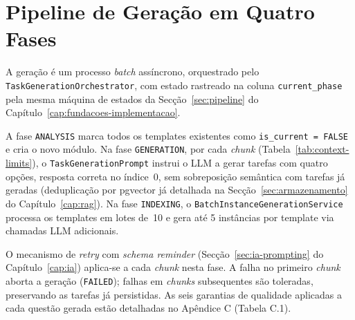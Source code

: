 \section{Pipeline de Geração em Quatro Fases} \label{sec:pipeline-geracao}

A geração é um processo \textit{batch} assíncrono, orquestrado pelo \texttt{TaskGenerationOrchestrator}, com estado rastreado na coluna \texttt{current\_phase} pela mesma máquina de estados da Secção~\ref{sec:pipeline} do Capítulo~\ref{cap:fundacoes-implementacao}.

A fase \texttt{ANALYSIS} marca todos os templates existentes como \texttt{is\_current = FALSE} e cria o novo módulo.
Na fase \texttt{GENERATION}, por cada \textit{chunk} (Tabela~\ref{tab:context-limits}), o \texttt{TaskGenerationPrompt} instrui o LLM a gerar tarefas com quatro opções, resposta correta no índice~0, sem sobreposição semântica com tarefas já geradas (deduplicação por pgvector já detalhada na Secção~\ref{sec:armazenamento} do Capítulo~\ref{cap:rag}).
Na fase \texttt{INDEXING}, o \texttt{BatchInstanceGenerationService} processa os templates em lotes de~10 e gera até 5 instâncias por template via chamadas LLM adicionais.

O mecanismo de \textit{retry} com \textit{schema reminder} (Secção~\ref{sec:ia-prompting} do Capítulo~\ref{cap:ia}) aplica-se a cada \textit{chunk} nesta fase. A falha no primeiro \textit{chunk} aborta a geração (\texttt{FAILED}); falhas em \textit{chunks} subsequentes são toleradas, preservando as tarefas já persistidas. As seis garantias de qualidade aplicadas a cada questão gerada estão detalhadas no Apêndice C (Tabela C.1).
